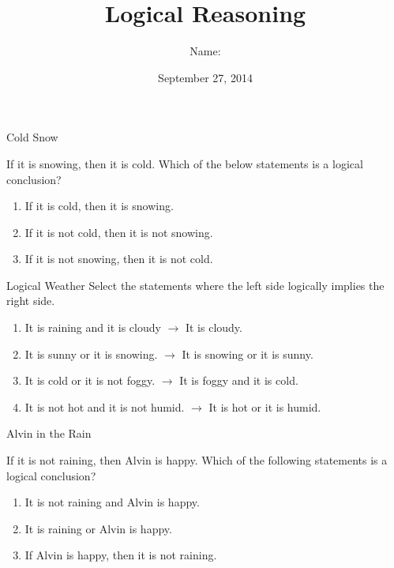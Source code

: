 \documentclass[12pt,letterpaper]{article}
\title{Logical Reasoning}
\author{Name: \underline{\hspace{5cm}}}
\date{September 27, 2014}
\begin{document}
\maketitle

\thispagestyle{empty}

\begin{problem}{Cold Snow}

If it is snowing, then it is cold. Which of the below statements is a logical
conclusion?

\begin{enumerate}[\hspace{.5cm}a.]
\item If it is cold, then it is snowing.
\item If it is not cold, then it is not snowing.
\item If it is not snowing, then it is not cold.
\end{enumerate}
\end{problem}

\begin{problem}{Logical Weather}
Select the statements where the left side logically implies the right side.

\begin{enumerate}[\hspace{.5cm}a.]
\item It is raining and it is cloudy $\to$ It is cloudy.
\item It is sunny or it is snowing. $\to$ It is snowing or it is sunny.
\item It is cold or it is not foggy. $\to$ It is foggy and it is cold.
\item It is not hot and it is not humid. $\to$ It is hot or it is humid.
\end{enumerate}
\end{problem}

\begin{problem}{Alvin in the Rain}

 If it is not raining, then Alvin is happy. Which of the following statements is
 a logical conclusion?

 \begin{enumerate}[\hspace{.5cm}a.]
  \item It is not raining and Alvin is happy.
  \item It is raining or Alvin is happy.
  \item If Alvin is happy, then it is not raining.
 \end{enumerate}
\end{problem}
\end{document}
